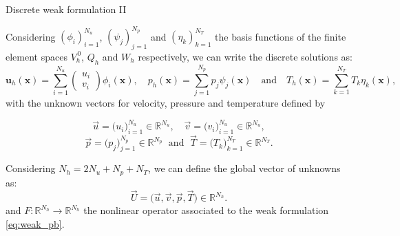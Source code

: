 \begin{frame}{Discrete weak formulation II}	

	Considering $(\phi_i)_{i=1}^{N_u}$, $(\psi_j)_{j=1}^{N_p}$ and $(\eta_k)_{k=1}^{N_T}$ the basis functions of the finite element spaces $V_h^{\, 0}$, $Q_h$ and $W_h$ respectively, we can write the discrete solutions as:
	\begin{equation*}
		\bm{u}_h(\bm{x}) = \sum_{i=1}^{N_u} \begin{pmatrix}
			u_i \\
			v_i
		\end{pmatrix} \phi_i(\bm{x}), \quad p_h(\bm{x}) = \sum_{j=1}^{N_p} p_j \psi_j(\bm{x}) \quad \text{and} \quad T_h(\bm{x}) = \sum_{k=1}^{N_T} T_k \eta_k(\bm{x}),
	\end{equation*}	
	with the unknown vectors for velocity, pressure and temperature defined by

	\vspace{-5pt}
	$$\vec{u} = \big(u_i\big)_{i=1}^{N_u} \in \mathbb{R}^{N_u}, \quad \vec{v} = \big(v_i\big)_{i=1}^{N_u} \in \mathbb{R}^{N_u},$$
	$$\vec{p} = \big(p_j\big)_{j=1}^{N_p} \in \mathbb{R}^{N_p} \; \text{ and } \; \vec{T} = \big(T_k\big)_{k=1}^{N_T} \in \mathbb{R}^{N_T}.$$

	\vspace{5pt}
	Considering $N_h = 2N_u + N_p + N_T$, we can define the global vector of unknowns as:
	\begin{equation*}
		\vec{U} = \big(\vec{u}, \vec{v}, \vec{p}, \vec{T}) \in \mathbb{R}^{N_h}.
	\end{equation*}
	and $F:\mathbb{R}^{N_h} \to \mathbb{R}^{N_h}$ the nonlinear operator associated to the weak formulation \eqref{eq:weak_pb}.
\end{frame}


